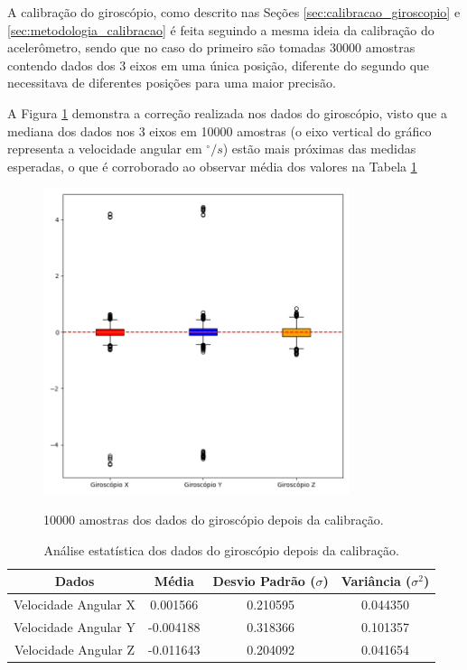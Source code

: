 \documentclass[acronym, symbols, table]{fei}
\begin{document}
	A calibração do giroscópio, como descrito nas Seções \ref{sec:calibracao_giroscopio} e \ref{sec:metodologia_calibracao} é feita seguindo a mesma ideia da calibração do acelerômetro, sendo que no caso do primeiro são tomadas 30000 amostras contendo dados dos 3 eixos em uma única posição, diferente do segundo que necessitava de diferentes posições para uma maior precisão.
	
	A Figura \ref{fig:dados_giroscopio_certo} demonstra a correção realizada nos dados do giroscópio, visto que a mediana dos dados nos 3 eixos em 10000 amostras (o eixo vertical do gráfico representa a velocidade angular em $^\circ/s$) estão mais próximas das medidas esperadas, o que é corroborado ao observar média dos valores na Tabela \ref{tab:giroscopio_depois_calibracao}
	
	\begin{figure}[!htb]
		\centering
		\caption{10000 amostras dos dados do giroscópio depois da calibração.}
		\includegraphics[width=0.8\textwidth]{dados_giroscopio_certos.png}
		\label{fig:dados_giroscopio_certo}
	\end{figure}
	
	\begin{table}[!htb]
		\centering
		\caption{Análise estatística dos dados do giroscópio depois da calibração.}\label{tab:giroscopio_depois_calibracao}
		\begin{tabular}{|c|c|c|c|}
			\hline
			Dados & Média & Desvio Padrão ($\sigma$) & Variância ($\sigma^2$) \\ \hline
			\small Velocidade Angular X & 0.001566  & 0.210595 & 0.044350 \\ \hline
			\small Velocidade Angular Y & -0.004188  & 0.318366 & 0.101357 \\ \hline
			\small Velocidade Angular Z & -0.011643 & 0.204092 & 0.041654 \\ \hline	
		\end{tabular}
	\end{table}
	
\end{document}
